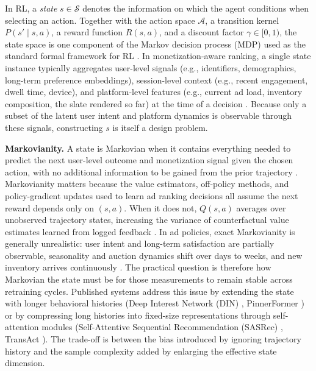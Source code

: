 \documentclass[manuscript,review,screen]{acmart}
\begin{document}
In RL, a \textit{state} $s \in \mathcal{S}$ denotes the information on which the agent conditions when selecting an action. Together with the action space $\mathcal{A}$, a transition kernel $P(s' \mid s, a)$, a reward function $R(s, a)$, and a discount factor $\gamma \in [0, 1)$, the state space is one component of the Markov decision process (MDP) used as the standard formal framework for RL \cite{Sutton1998, puterman2014markov}. In monetization-aware ranking, a single state instance typically aggregates user-level signals (e.g., identifiers, demographics, long-term preference embeddings), session-level context (e.g., recent engagement, dwell time, device), and platform-level features (e.g., current ad load, inventory composition, the slate rendered so far) at the time of a decision \cite{zhao2021dear, ie2019slateq, xia2023transact}. Because only a subset of the latent user intent and platform dynamics is observable through these signals, constructing $s$ is itself a design problem.

\textbf{Markovianity.} A state is Markovian when it contains everything needed to predict the next user-level outcome and monetization signal given the chosen action, with no additional information to be gained from the prior trajectory \cite{puterman2014markov}. Markovianity matters because the value estimators, off-policy methods, and policy-gradient updates used to learn ad ranking decisions all assume the next reward depends only on $(s, a)$. When it does not, $Q(s, a)$ averages over unobserved trajectory states, increasing the variance of counterfactual value estimates learned from logged feedback \cite{swaminathan2015counterfactual}. In ad policies, exact Markovianity is generally unrealistic: user intent and long-term satisfaction are partially observable, seasonality and auction dynamics shift over days to weeks, and new inventory arrives continuously \cite{dulac2021challenges, hohnhold2015focusing}. The practical question is therefore how Markovian the state must be for those measurements to remain stable across retraining cycles. Published systems address this issue by extending the state with longer behavioral histories (Deep Interest Network (DIN) \cite{Zhou2018}, PinnerFormer \cite{pancha2022pinnerformer}) or by compressing long histories into fixed-size representations through self-attention modules (Self-Attentive Sequential Recommendation (SASRec) \cite{kang2018sasrec}, TransAct \cite{xia2023transact}). The trade-off is between the bias introduced by ignoring trajectory history and the sample complexity added by enlarging the effective state dimension.
\end{document}
